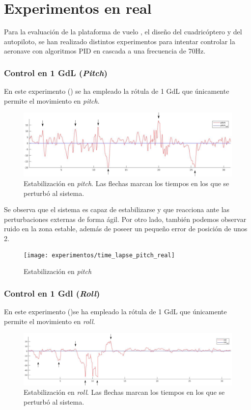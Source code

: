 \section{Experimentos en real}
Para la evaluación de la plataforma de vuelo , el diseño del cuadricóptero y del autopiloto, se han realizado distintos experimentos para intentar controlar la aeronave con algoritmos PID en cascada a una frecuencia de 70Hz.
\subsubsection{Control en 1 GdL (\textit{Pitch})}

En este experimento () se ha empleado la rótula de 1 GdL que únicamente permite el movimiento en \textit{pitch}.

\begin{figure}[htb!]
	\centering
	\includegraphics[width=\textwidth]{experimentos/real_only_pitch}
	\caption{Estabilización en \textit{pitch}. Las flechas marcan los tiempos en los que se perturbó al sistema.}
	\label{mat_lab_}	
\end{figure}

Se observa que el sistema es capaz de estabilizarse y que reacciona ante las perturbaciones externas de forma ágil. Por otro lado, también podemos observar ruido en la zona estable, además de poseer un pequeño error de posición de unos 2\grad.

\begin{figure}[htb!]
	\centering
	\texttt{[image: experimentos/time\_lapse\_pitch\_real]}
	\caption{Estabilización en \textit{pitch}}
	\label{tl_pr}	
\end{figure}


\subsubsection{Control en 1 Gdl (\textit{Roll})}
En este experimento ()se ha empleado la rótula de 1 GdL que únicamente permite el movimiento en \textit{roll}.

\begin{figure}[htb!]
	\centering
	\includegraphics[height=0.18\textheight,width=\textwidth]{experimentos/real_only_roll}
	\caption{Estabilización en \textit{roll}. Las flechas marcan los tiempos en los que se perturbó al sistema.}
	\label{mat_lab_gra}	
\end{figure}

